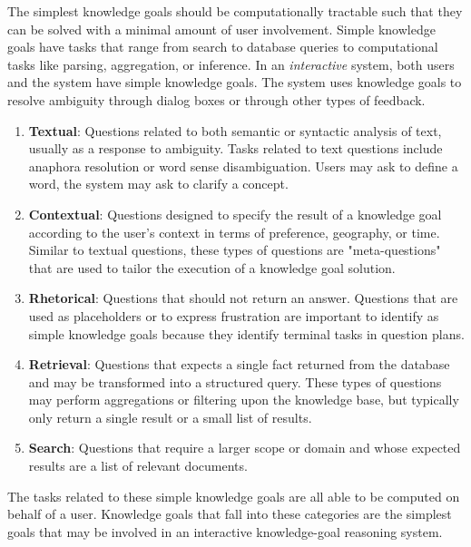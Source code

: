 \documentclass[11pt,letterpaper]{article}
\begin{document}
The simplest knowledge goals should be computationally tractable such that they can be solved with a minimal amount of user involvement. Simple knowledge goals have tasks that range from search to database queries to computational tasks like parsing, aggregation, or inference. In an \textit{interactive} system, both users and the system have simple knowledge goals. The system uses knowledge goals to resolve ambiguity through dialog boxes or through other types of feedback.

\begin{enumerate}

\item \textbf{Textual}: Questions related to both semantic or syntactic analysis of text, usually as a response to ambiguity. Tasks related to text questions include anaphora resolution or word sense disambiguation. Users may ask to define a word, the system may ask to clarify a concept.

\item \textbf{Contextual}: Questions designed to specify the result of a knowledge goal according to the user's context in terms of preference, geography, or time. Similar to textual questions, these types of questions are "meta-questions" that are used to tailor the execution of a knowledge goal solution.

\item \textbf{Rhetorical}: Questions that should not return an answer. Questions that are used as placeholders or to express frustration are important to identify as simple knowledge goals because they identify terminal tasks in question plans.

\item \textbf{Retrieval}: Questions that expects a single fact returned from the database and may be transformed into a structured query. These types of questions may perform aggregations or filtering upon the knowledge base, but typically only return a single result or a small list of results.

\item \textbf{Search}: Questions that require a larger scope or domain and whose expected results are a list of relevant documents.

\end{enumerate}

The tasks related to these simple knowledge goals are all able to be computed on behalf of a user. Knowledge goals that fall into these categories are the simplest goals that may be involved in an interactive knowledge-goal reasoning system.
\end{document}
